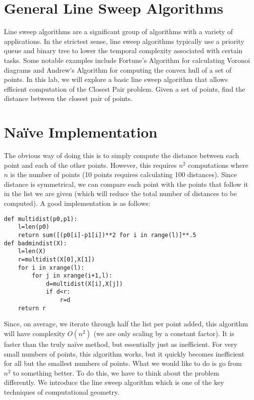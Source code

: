 

\section*{General Line Sweep Algorithms}

Line sweep algorithms are a significant group of algorithms with a variety of applications. 
In the strictest sense, line sweep algorithms typically use a priority queue and binary tree to lower the temporal complexity associated with certain tasks. 
Some notable examples include Fortune's Algorithm for calculating Voronoi diagrams and Andrew's Algorithm for computing the convex hull of a set of points. 
In this lab, we will explore a basic line sweep algorithm that allows efficient computation of the Closest Pair problem.  Given a set of points, find the distance between the closest pair of points.

\section*{Na\"ive Implementation}

The obvious way of doing this is to simply compute the distance between each point and each of the other points.
However, this requires $n^2$ computations where $n$ is the number of points (10 points requires calculating 100 distances).
Since distance is symmetrical, we can compare each point with the points that follow it in the list we are given (which will reduce
the total number of distances to be computed).
A good implementation is as follows:
\begin{lstlisting}
def multidist(p0,p1):
    l=len(p0)
    return sum([(p0[i]-p1[i])**2 for i in range(l)]**.5
def badmindist(X):
    l=len(X)
    r=multidist(X[0],X[1])
    for i in xrange(l):
        for j in xrange(i+1,l):
            d=multidist(X[i],X[j])
            if d<r:
                r=d
    return r
\end{lstlisting}

Since, on average, we iterate through half the list per point added, this algorithm will have complexity $O(n^2)$ (we are only scaling by a constant factor).  It is faster than the truly na\"ive method, but essentially just as inefficient.
For very small numbers of points, this algorithm works, but it quickly becomes inefficient for all but the smallest numbers of points.  What we would like to do is go from $n^2$ to something better.  To do this, we have to think about the problem differently.
We introduce the line sweep algorithm which is one of the key techniques of computational geometry.

